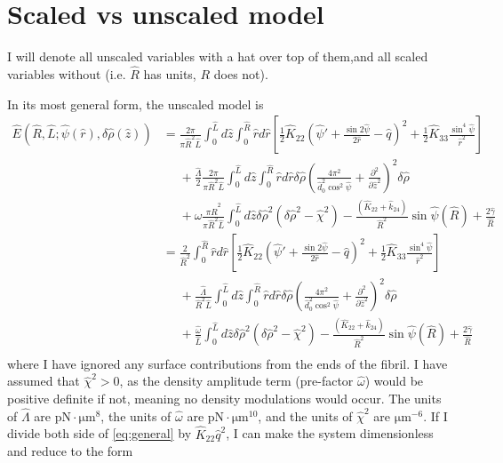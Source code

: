 \documentclass[12pt]{article}
\begin{document}


\section{Scaled vs unscaled model}
I will denote all unscaled variables with a hat over top of them,and all scaled variables without (i.e. $\hat{R}$ has units, $R$ does not).

In its most general form, the unscaled model is
\begin{align}\label{eq:general}
\hat{E}(\hat{R},\hat{L};\hat{\psi}(\hat{r}),\delta\hat{\rho}(\hat{z}))&=\frac{2\pi}{\pi\hat{R}^2\hat{L}}\int_0^{\hat{L}}d\hat{z}\int_0^{\hat{R}}\hat{r}d\hat{r}\left[\frac{1}{2}\hat{K}_{22}\left(\hat{\psi}'+\frac{\sin2\hat{\psi}}{2\hat{r}}-\hat{q}\right)^2+\frac{1}{2}\hat{K}_{33}\frac{\sin^4\hat{\psi}}{\hat{r}^2}\right]\nonumber\\
&\phantom{=}+\frac{\hat{\Lambda}}{2}\frac{2\pi}{\pi\hat{R}^2\hat{L}}\int_0^{\hat{L}}d\hat{z}\int_0^{\hat{R}}\hat{r}d\hat{r}\delta\hat{\rho}\left(\frac{4\pi^2}{\hat{d}^2_0\cos^2\hat{\psi}}+\frac{\partial^2}{\partial\hat{z}^2}\right)^2\delta\hat{\rho}\nonumber\\
&\phantom{=}+\hat{\omega}\frac{\pi\hat{R}^2}{\pi\hat{R}^2\hat{L}}\int_0^{\hat{L}}d\hat{z}\delta\hat{\rho}^2\left(\delta\hat{\rho}^2-\hat{\chi}^2\right)-\frac{(\hat{K}_{22}+\hat{k}_{24})}{\hat{R}^2}\sin\hat{\psi}(\hat{R})+\frac{2\hat{\gamma}}{\hat{R}}\nonumber\\
&=\frac{2}{\hat{R}^2}\int_0^{\hat{R}}\hat{r}d\hat{r}\left[\frac{1}{2}\hat{K}_{22}\left(\hat{\psi}'+\frac{\sin2\hat{\psi}}{2\hat{r}}-\hat{q}\right)^2+\frac{1}{2}\hat{K}_{33}\frac{\sin^4\hat{\psi}}{\hat{r}^2}\right]\nonumber\\
&\phantom{=}+\frac{\hat{\Lambda}}{\hat{R}^2\hat{L}}\int_0^{\hat{L}}d\hat{z}\int_0^{\hat{R}}\hat{r}d\hat{r}\delta\hat{\rho}\left(\frac{4\pi^2}{\hat{d}^2_0\cos^2\hat{\psi}}+\frac{\partial^2}{\partial\hat{z}^2}\right)^2\delta\hat{\rho}\nonumber\\
&\phantom{=}+\frac{\hat{\omega}}{\hat{L}}\int_0^{\hat{L}}d\hat{z}\delta\hat{\rho}^2\left(\delta\hat{\rho}^2-\hat{\chi}^2\right)-\frac{(\hat{K}_{22}+\hat{k}_{24})}{\hat{R}^2}\sin\hat{\psi}(\hat{R})+\frac{2\hat{\gamma}}{\hat{R}}\nonumber\\
\end{align}
where I have ignored any surface contributions from the ends of the fibril. I have assumed that $\hat{\chi}^2>0$, as the density amplitude term (pre-factor $\hat{\omega}$) would be positive definite if not, meaning no density modulations would occur. The units of $\hat{\Lambda}$ are $\si{\pico\newton\cdot\micro\meter^8}$, the units of $\hat{\omega}$ are $\si{\pico\newton\cdot\micro\meter^{10}}$, and the units of $\hat{\chi}^2$ are $\si{\micro\meter^{-6}}$. If I divide both side of \ref{eq:general} by $\hat{K}_{22}\hat{q}^2$, I can make the system dimensionless and reduce to the form
\end{document}
